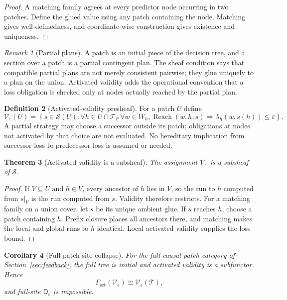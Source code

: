 \documentclass[11pt]{article}
\theoremstyle{plain}
\newtheorem{theorem}{Theorem}[section]
\newtheorem{corollary}[theorem]{Corollary}
\theoremstyle{definition}
\newtheorem{definition}[theorem]{Definition}
\theoremstyle{remark}
\newtheorem{remark}[theorem]{Remark}
\newcommand{\eps}{\varepsilon}
\begin{document}
\begin{proof}
A matching family agrees at every predictor node occurring in two patches.
Define the glued value using any patch containing the node. Matching gives
well-definedness, and coordinate-wise construction gives existence and
uniqueness.
\end{proof}

\begin{remark}[Partial plans]
A patch is an initial piece of the decision tree, and a section over a patch is a
partial contingent plan. The sheaf condition says that compatible partial plans
are not merely consistent pairwise; they glue uniquely to a plan on the union.
Activated validity adds the operational convention that a loss obligation is
checked only at nodes actually reached by the partial plan.
\end{remark}

\begin{definition}[Activated-validity presheaf]\label{def:activated}
For a patch $U$ define
\[
\mathscr V_\eps(U)=
\left\{s\in\mathscr S(U):
\forall h\in U\cap \mathcal T_P\,\forall w\in W_h,
\operatorname{Reach}(w,h;s)
\Rightarrow
\lambda_h(w,s(h))\le\eps
\right\}.
\]
A partial strategy may choose a successor outside its patch; obligations at
nodes not activated by that choice are not evaluated. No hereditary implication
from successor loss to predecessor loss is assumed or needed.
\end{definition}

\begin{theorem}[Activated validity is a subsheaf]\label{thm:activated-sheaf}
The assignment $\mathscr V_\eps$ is a subsheaf of $\mathscr S$.
\end{theorem}

\begin{proof}
If $V\subseteq U$ and $h\in V$, every ancestor of $h$ lies in $V$, so the run
to $h$ computed from $s|_V$ is the run computed from $s$. Validity therefore
restricts. For a matching family on a union cover, let $s$ be its unique ambient
glue. If $s$ reaches $h$, choose a patch containing $h$. Prefix closure places
all ancestors there, and matching makes the local and global runs to $h$
identical. Local activated validity supplies the loss bound.
\end{proof}

\begin{corollary}[Full patch-site collapse]\label{cor:patch-collapse}
For the full causal patch category of Section~\ref{sec:feedback}, the full tree
is initial and activated validity is a subfunctor. Hence
\[
\Gamma_{\mathrm{set}}(\mathscr V_\eps)
\cong\mathscr V_\eps(\mathcal T),
\]
and full-site $\mathsf D_\eps$ is impossible.
\end{corollary}
\end{document}
